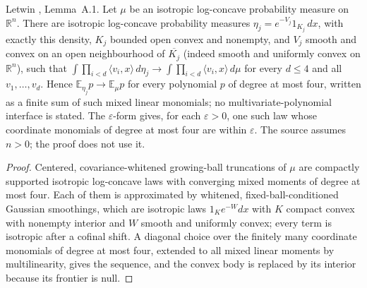 \begin{lemma}
  \label{lem:letwin-regular-approximation}
  \leanok
  Letwin \cite{Letwin2026QuadraticKLS}, Lemma~A.1. Let $\mu$ be an isotropic log-concave probability measure on
  $\mathbb R^n$. There are isotropic log-concave probability measures $\eta_j=e^{-V_j}1_{K_j}\,dx$, with exactly this
  density, $K_j$ bounded open convex and nonempty, and $V_j$ smooth and convex on an open neighbourhood of
  $\overline{K_j}$ (indeed smooth and uniformly convex on $\mathbb R^n$), such that
  $\int\prod_{i<d}\langle v_i,x\rangle\,d\eta_j\to\int\prod_{i<d}\langle v_i,x\rangle\,d\mu$ for every $d\le4$ and all
  $v_1,\dots,v_d$. Hence $\mathbb E_{\eta_j}p\to\mathbb E_\mu p$ for every polynomial $p$ of degree at most four, written
  as a finite sum of such mixed linear monomials; no multivariate-polynomial interface is stated. The $\varepsilon$-form
  gives, for each $\varepsilon>0$, one such law whose coordinate monomials of degree at most four are within
  $\varepsilon$. The source assumes $n>0$; the proof does not use it.
\end{lemma}
\begin{proof}
  \leanok
  Centered, covariance-whitened growing-ball truncations of $\mu$ are compactly supported isotropic log-concave laws
  with converging mixed moments of degree at most four. Each of them is approximated by whitened, fixed-ball-conditioned
  Gaussian smoothings, which are isotropic laws $1_Ke^{-W}dx$ with $K$ compact convex with nonempty interior and $W$
  smooth and uniformly convex; every term is isotropic after a cofinal shift. A diagonal choice over the finitely many
  coordinate monomials of degree at most four, extended to all mixed linear moments by multilinearity, gives the
  sequence, and the convex body is replaced by its interior because its frontier is null.
\end{proof}


